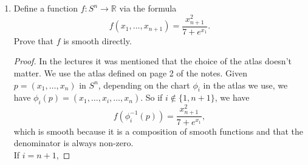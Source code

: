 \documentclass{article}
\begin{document}
\begin{enumerate}[label={\bf Q\arabic*:}]
  \item Define a function $f:S^n\rightarrow\mathbb{R}$ via the formula
    \begin{equation*}
      f(x_1,\ldots,x_{n+1}) = \frac{x_{n+1}^2}{7+e^{x_1}}.
    \end{equation*}
    Prove that $f$ is smooth directly.

    \begin{proof}
      In the lectures it was mentioned that the choice of the atlas doesn't
      matter. We use the atlas defined on page 2 of the notes. Given
      $p=(x_1,\ldots,x_n)$ in $S^n$, depending on the chart $\phi_i$ in the
      atlas we use, we have $\phi_i(p)=(x_1,\ldots,\hat{x_i},\ldots,x_n)$.
      So if $i\not\in\{1,n+1\}$, we have
      \begin{equation*}
        f(\phi_i^{-1}(p)) = \frac{x_{n+1}^2}{7+e^{x_1}},
      \end{equation*}
      which is smooth because it is a composition of smooth functions and
      that the denominator is always non-zero. \\

      If $i=n+1$, 
    \end{proof}
\end{enumerate}
\end{document}
